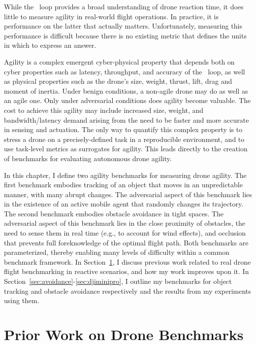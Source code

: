 \label{ch:benchmarks}
While the \ooda~loop provides a broad understanding of drone reaction time, it does little to measure agility in real-world flight operations. In practice, it is performance on the latter that actually matters. Unfortunately, measuring this performance is difficult because there is no existing metric that defines the units in which to express an answer.

Agility is a complex emergent cyber-physical property that depends
both on cyber properties such as latency, throughput, and accuracy of
the \ooda~loop, as well as physical properties such as the drone's
size, weight, thrust, lift, drag and moment of inertia.  Under benign
conditions, a non-agile drone may do as well as an agile one.  Only
under adversarial conditions does agility become valuable.
The cost to achieve this agility may include increased size, weight, and bandwidth/latency
demand arising from the need to be faster and more accurate in sensing
and actuation.  The only way to quantify this complex property is to
stress a drone on a precisely-defined task in a reproducible
environment, and to use task-level metrics as surrogates for agility.
This leads directly to the creation of benchmarks for evaluating
autonomous drone agility.

In this chapter, I define two agility benchmarks for measuring drone agility. The first benchmark embodies tracking of an object that moves in an unpredictable manner, with many abrupt changes. The adversarial aspect of this benchmark lies in the existence of an active mobile agent that randomly changes its trajectory. The second benchmark embodies obstacle avoidance in tight spaces. The adversarial aspect of this benchmark lies in the close proximity of obstacles, the need to sense them in real time (e.g., to account for wind effects), and occlusion that prevents full foreknowledge of the optimal flight path.  Both benchmarks are parameterized, thereby enabling many levels of difficulty within a common benchmark framework. In Section~\ref{sec:prior-work-benchmarks}, I discuss previous work related to real drone flight benchmarking in reactive scenarios, and how my work improves upon it. In Section~\ref{sec:avoidance}-\ref{sec:djiminipro}, I outline my benchmarks for object tracking and obstacle avoidance respectively and the results from my experiments using them.

\section{Prior Work on Drone Benchmarks}
\label{sec:prior-work-benchmarks}

